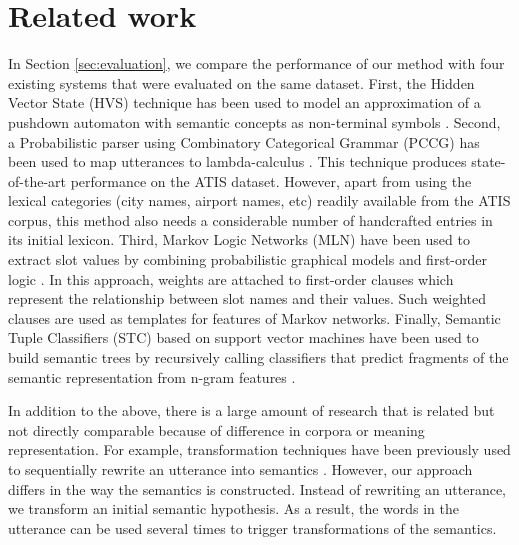 \documentclass{article}
\begin{document}
\section{Related work}

In Section \ref{sec:evaluation}, we compare the performance of our method with four existing systems that were evaluated on the same dataset. 
First, the Hidden Vector State (HVS) technique has been used to model an approximation of a pushdown automaton with semantic concepts as non-terminal symbols \cite{he05,jurcicek08}. 
Second, a Probabilistic parser using Combinatory Categorical Grammar   (PCCG) has been used to map utterances to lambda-calculus \cite{zettlemoyer07}. 
This technique produces state-of-the-art performance on the ATIS dataset. However, apart from using the lexical categories (city names, airport names, etc) readily available from the ATIS corpus, this method also needs a considerable number of handcrafted entries in its initial lexicon. 
Third, Markov Logic Networks (MLN) have been used to extract slot values by combining probabilistic graphical models and first-order logic \cite{meza08b}. In this approach, weights are attached to first-order clauses which represent the relationship between slot names and their values. Such weighted clauses are used as templates for features of Markov networks.
Finally, Semantic Tuple Classifiers (STC) based on support vector machines have been used to build semantic trees by recursively calling classifiers that predict fragments of the semantic representation from n-gram features \cite{mairesse09}.

In addition to the above, there is a large amount of research that is related but not directly comparable because of difference in corpora or meaning representation. 
For example, transformation techniques have been previously used to sequentially rewrite an utterance into semantics \cite{kate05}. However, our approach differs in the way the semantics is constructed. Instead of rewriting an utterance, we transform an initial semantic hypothesis. As a result, the words in the utterance can be used several times to trigger transformations of the semantics. 
\end{document}
